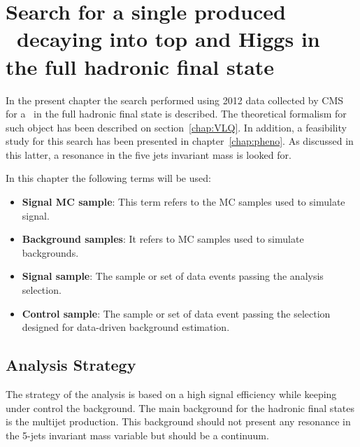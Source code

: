 \chapter[Single VLQ search]{Search for a single produced \Tp~decaying into top and Higgs in the full hadronic final state}
\label{chap:search}

In the present chapter the search performed using 2012 data collected by CMS for a \Tp~in the full hadronic final state is described. The theoretical formalism for such object has been described on section~\ref{chap:VLQ}. In addition, a feasibility study for this search has been presented in chapter~\ref{chap:pheno}. As discussed in this latter, a resonance in the five jets invariant mass is looked for.

In this chapter the following terms will be used:
\begin{itemize}
\item \textbf{Signal MC sample}: This term refers to the MC samples used to simulate signal.
\item \textbf{Background samples}: It refers to MC samples used to simulate backgrounds.
\item \textbf{Signal sample}: The sample or set of data events passing the analysis selection.
\item \textbf{Control sample}: The sample or set of data event passing the selection designed for data-driven background estimation.
\end{itemize}

\section{Analysis Strategy}
\label{sec:stra}

The strategy of the analysis is based on a high signal efficiency while keeping under control the background. The main background for the hadronic final states is the multijet production. This background should not present any resonance in the 5-jets invariant mass variable but should be a continuum. %

